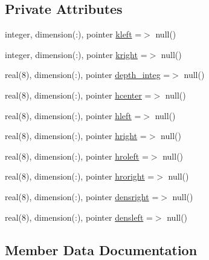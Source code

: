 \subsection*{Private Attributes}
\begin{DoxyCompactItemize}
\item 
integer, dimension(\+:), pointer \mbox{\hyperlink{structmodulehydrodynamic_1_1t__coef__baroc_a383d88fa638e0976aabdef1de45d8bba}{kleft}} =$>$ null()
\item 
integer, dimension(\+:), pointer \mbox{\hyperlink{structmodulehydrodynamic_1_1t__coef__baroc_a043e321f4950c05cc07569008b35e904}{kright}} =$>$ null()
\item 
real(8), dimension(\+:), pointer \mbox{\hyperlink{structmodulehydrodynamic_1_1t__coef__baroc_ada51b85d55c87ba77b43ee79527930bc}{depth\+\_\+integ}} =$>$ null()
\item 
real(8), dimension(\+:), pointer \mbox{\hyperlink{structmodulehydrodynamic_1_1t__coef__baroc_af14be5aa899fa3f2ce92a07101a97805}{hcenter}} =$>$ null()
\item 
real(8), dimension(\+:), pointer \mbox{\hyperlink{structmodulehydrodynamic_1_1t__coef__baroc_a2b346fcc6926d31b782d61a48b916bbd}{hleft}} =$>$ null()
\item 
real(8), dimension(\+:), pointer \mbox{\hyperlink{structmodulehydrodynamic_1_1t__coef__baroc_a75a0b89084cbbc74390ac534d4e1bae9}{hright}} =$>$ null()
\item 
real(8), dimension(\+:), pointer \mbox{\hyperlink{structmodulehydrodynamic_1_1t__coef__baroc_a9634f6fce1f4a4c9a930c78d4e90a6d9}{hroleft}} =$>$ null()
\item 
real(8), dimension(\+:), pointer \mbox{\hyperlink{structmodulehydrodynamic_1_1t__coef__baroc_a5c3873e6cf056891f1979bec7b1e9320}{hroright}} =$>$ null()
\item 
real(8), dimension(\+:), pointer \mbox{\hyperlink{structmodulehydrodynamic_1_1t__coef__baroc_a21dddc828fa0d2c5f017dd92ce4474f5}{densright}} =$>$ null()
\item 
real(8), dimension(\+:), pointer \mbox{\hyperlink{structmodulehydrodynamic_1_1t__coef__baroc_a830002104c0e425e601f5ca325fba74e}{densleft}} =$>$ null()
\end{DoxyCompactItemize}


\subsection{Member Data Documentation}
\mbox{\label{structmodulehydrodynamic_1_1t__coef__baroc_a830002104c0e425e601f5ca325fba74e}} 

